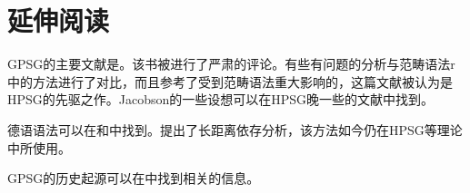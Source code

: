 \section*{延伸阅读}

GPSG的主要文献是。该书被\citet{Jacobson87b}进行了严肃的评论。有些有问题的分析与范畴语法r\indexcg 中的方法进行了对比，而且参考了受到范畴语法重大影响的\citet{Pollard84a-u}，这篇文献被认为是HPSG的先驱之作。Jacobson的一些设想可以在HPSG晚一些的文献中找到。

德语语法可以在和中找到。\citet{Gazdar81}提出了长距离依存分析，该方法如今仍在HPSG等理论中所使用。

GPSG的历史起源可以在中找到相关的信息。



